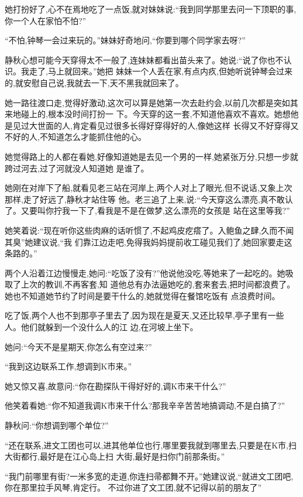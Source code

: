 ﻿\documentclass[12pt]{article}
\begin{document}
她打扮好了,心不在焉地吃了一点饭,就对妹妹说:``我到同学那里去问一下顶职的事,你一个人在家怕不怕?''

``不怕,钟琴一会过来玩的。''妹妹好奇地问,``你要到哪个同学家去呀?''

静秋心想可能今天穿得太不一般了,连妹妹都看出苗头来了。她说:``说了你也不认识。我走了,马上就回来。''她把
妹妹一个人丢在家,有点内疚,但她听说钟琴会过来的,就安慰自己说,我就去一下,天不黑我就回来了。

她一路往渡口走,觉得好激动,这次可以算是她第一次去赴约会,以前几次都是突如其来地碰上的,根本没时间打扮一
下。今天穿的这一套,不知道他喜欢不喜欢。她想他是见过大世面的人,肯定看见过很多长得好穿得好的人,像她这样
长得又不好穿得又不好的人,不知道怎么才能抓住他的心。

她觉得路上的人都在看她,好像知道她是去见一个男的一样,她紧张万分,只想一步就跨过河去,过了河就没人知道她
是谁了。

她刚在对岸下了船,就看见老三站在河岸上,两个人对上了眼光,但不说话,又象上次那样,走了好远了,静秋才站住等
他。老三追了上来,说:``今天穿这么漂亮,真不敢认了。又要叫你拧我一下了,看我是不是在做梦,这么漂亮的女孩是
站在这里等我?''

她笑着说:``现在听你这些肉麻的话听惯了,不起鸡皮疙瘩了。入鲍鱼之肆,久而不闻其臭\myrule ''她建议说,``我
们靠江边走吧,免得我妈妈提前收工碰见我们了,她回家要走这条路的。''

两个人沿着江边慢慢走,她问:``吃饭了没有?''他说他没吃,等她来了一起吃的。她吸取了上次的教训,不再客套,知
道他总有办法逼她吃的,套来套去,把时间都浪费了。她也不知道她节约了时间是要干什么的,她就觉得在餐馆吃饭有
点浪费时间。

吃了饭,两个人也不到那亭子里去了,因为现在是夏天,又还比较早,亭子里有一些人。他们就躲到一个没什么人的江
边,在河坡上坐下。

她问:``今天不是星期天,你怎么有空过来?''

``我到这边联系工作,想调到K市来。''

她又惊又喜,故意问:``你\myrule 在勘探队干得好好的,调K市来干什么?''

他笑着看她:``你不知道我调K市来干什么?那我辛辛苦苦地搞调动,不是白搞了?''

静秋问:``你想调到哪个单位?''

``还在联系,进文工团也可以,进其他单位也行,哪里要我就到哪里去,只要是在K市,扫大街都行,最好是在江心岛上扫
大街,最好是扫你门前那条街。''

``我门前哪里有街?一米多宽的走道,你连扫帚都舞不开。''她建议说,``就进文工团吧,你在那里拉手风琴,肯定行。
不过你进了文工团,就\myrule 不记得\myrule 以前的\myrule 朋友了\myrule ''
\end{document}
